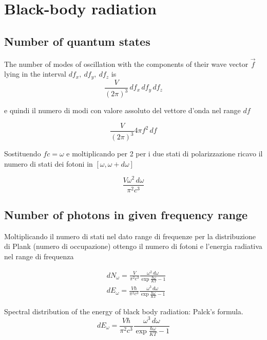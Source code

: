 \section{Black-body radiation}

\subsection{Number of quantum states}

The number of modes of oscillation with the components of their wave vector $\vec{f}$ lying in the interval $df_x,\ df_y,\ df_z$ is
\begin{equation*}
\frac{V}{(2\pi)^3}\,df_x\,df_y\,df_z
\end{equation*}

e quindi il numero di modi con valore assoluto del vettore d'onda nel range $df$

\begin{equation*}
\frac{V}{(2\pi)^3}4\pi f^2\,df
\end{equation*}

Sostituendo $fc=\omega$ e moltiplicando per 2 per i due stati di polarizzazione ricavo il numero di stati dei fotoni in $[\omega,\omega+d\omega]$

\begin{equation*}
\frac{V\omega^2\,d\omega}{\pi^2c^3}
\end{equation*}

\subsection{Number of photons in given frequency range}

Moltiplicando il numero di stati nel dato range di frequenze per la distribuzione di Plank (numero di occupazione) ottengo il numero di fotoni e l'energia radiativa nel range di frequenza

\begin{align*}
&dN_{\omega}=\frac{V}{\pi^2c^3}\frac{\omega^2\,d\omega}{\exp{\frac{\hbar\omega}{KT}}-1}\\
&dE_{\omega}=\frac{V\hbar}{\pi^2c^3}\frac{\omega^3\,d\omega}{\exp{\frac{\hbar\omega}{KT}}-1}
\end{align*}

\begin{usefull}{Spectral distribution of the energy of black body radiation: Palck's formula.}
\begin{equation}
dE_{\omega}=\frac{V\hbar}{\pi^2c^3}\frac{\omega^3\,d\omega}{\exp{\frac{\hbar\omega}{KT}}-1}
\end{equation}
\end{usefull}

